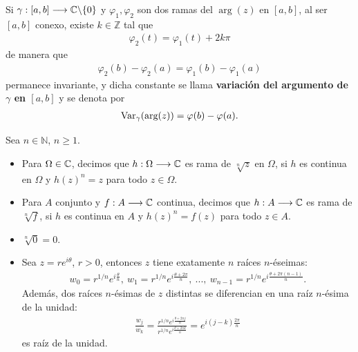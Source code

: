 \begin{obs}
    Si $\gamma : [a,b] \longrightarrow \mathbb{C} \backslash \{0\}$ y $\varphi_1,\varphi_2$ son dos ramas del $\arg(z)$ en $[a,b]$, al ser $[a,b]$ conexo, existe $k \in \mathbb{Z}$ tal que
    \begin{align*}
        \varphi_2(t) = \varphi_1(t) + 2k\pi
    \end{align*}
    de manera que
    \begin{align*}
        \varphi_2(b) - \varphi_2(a) = \varphi_1(b) - \varphi_1(a)
    \end{align*}
    permanece invariante, y dicha constante se llama \textbf{variación del argumento de $\gamma$ en $[a,b]$} y se denota por
    \begin{align*}
        \text{Var}_{\gamma}(\text{arg}(z)) = \varphi(b) - \varphi(a).
    \end{align*}
\end{obs}
\begin{defi}
    Sea $n \in \mathbb{N}$, $n \ge 1$.
    \begin{itemize}
        \item Para $\Omega \in \mathbb{C}$, decimos que $h : \Omega \longrightarrow \mathbb{C}$ es rama de $\sqrt[n]{z}$ en $\Omega$, si $h$ es continua en $\Omega$ y $h(z)^n = z$ para todo $z \in \Omega$.
        \item Para $A$ conjunto y $f: A \longrightarrow \mathbb{C}$ continua, decimos que $h : A \longrightarrow \mathbb{C}$ es rama de $\sqrt[n]{f}$, si $h$ es continua en $A$ y $h(z)^n = f(z)$ para todo $z \in A$.
    \end{itemize}
\end{defi}

\begin{obs}
    \begin{itemize}
        \item $\sqrt[n]{0} = 0$.
        \item Sea $z = re^{i\theta}$, $r > 0$, entonces $z$ tiene exatamente $n$ raíces $n$-éseimas:
              \begin{align*}
                  w_0 = r^{1/n}e^{i\frac{\theta}{n}}, \ w_1 = r^{1/n}e^{i\frac{\theta + 2\pi}{n}}, \ ..., \ w_{n-1} = r^{1/n}e^{i\frac{\theta + 2\pi(n-1)}{n}}.
              \end{align*}
              Además, dos raíces $n$-ésimas de $z$ distintas se diferencian en una raíz $n$-ésima de la unidad:
              \begin{align*}
                  \frac{w_j}{w_k} = \frac{r^{1/n}e^{i\frac{\theta + 2\pi j}{n}}}{r^{1/n}e^{i\frac{\theta + 2\pi k}{n}}} = e^{i(j - k)\frac{2\pi}{n}}
              \end{align*}
              es raíz de la unidad.
    \end{itemize}
\end{obs}

